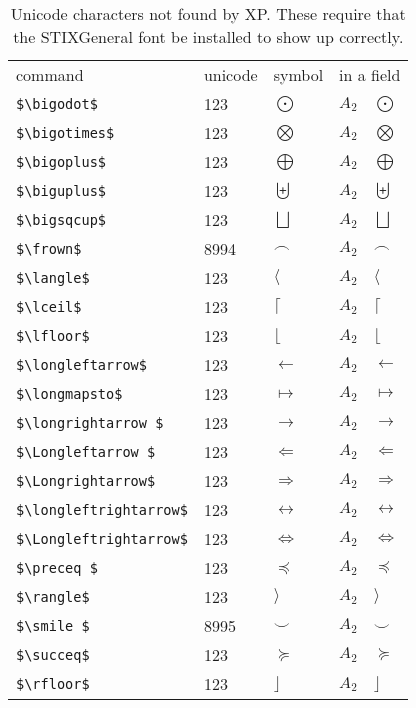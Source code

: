 \documentclass{article}
\begin{document}
\begin{table}
\begin{center}
\begin{tabular}{llll}
 command                   & unicode & symbol          & in a field\\
\verb#$\bigodot$#             & 123 & $\bigodot$        & $A_2 \quad \bigodot$\\
\verb#$\bigotimes$#           & 123 & $\bigotimes$      & $A_2 \quad \bigotimes$\\
\verb#$\bigoplus$#            & 123 & $\bigoplus$       & $A_2 \quad \bigoplus$\\
\verb#$\biguplus$#            & 123 & $\biguplus$       & $A_2 \quad \biguplus$\\
\verb#$\bigsqcup$#            & 123 & $\bigsqcup$       & $A_2 \quad \bigsqcup$\\
\verb#$\frown$#               & 8994 & $\frown$          & $A_2 \quad \frown$\\
\verb#$\langle$#              & 123 & $\langle$         & $A_2 \quad \langle$\\
\verb#$\lceil$#               & 123 & $\lceil$          & $A_2 \quad \lceil$\\
\verb#$\lfloor$#              & 123 & $\lfloor$         & $A_2 \quad \lfloor$\\
\verb#$\longleftarrow$#       & 123 & $\longleftarrow $ & $A_2 \quad \longleftarrow $\\
\verb#$\longmapsto$#          & 123 & $\longmapsto$     & $A_2 \quad \longmapsto$\\
\verb#$\longrightarrow $#     & 123 & $\longrightarrow$ & $A_2 \quad \longrightarrow $\\
\verb#$\Longleftarrow $#      & 123 & $\Longleftarrow $ & $A_2 \quad \Longleftarrow $\\
\verb#$\Longrightarrow$#      & 123 & $\Longrightarrow$ & $A_2 \quad \Longrightarrow$\\
\verb#$\longleftrightarrow$#  & 123 & $\longleftrightarrow$ & $A_2 \quad \longleftrightarrow $\\
\verb#$\Longleftrightarrow$#  & 123 & $\Longleftrightarrow$ & $A_2 \quad \Longleftrightarrow$\\
\verb#$\preceq $#             & 123 & $\preceq $        & $A_2 \quad \preceq $\\
\verb#$\rangle$#              & 123 & $\rangle$         & $A_2 \quad \rangle$\\
\verb#$\smile $#              & 8995 & $\smile $         & $A_2 \quad \smile $\\
\verb#$\succeq$#              & 123 & $\succeq$         & $A_2 \quad \succeq$\\
\verb#$\rfloor$#              & 123 & $\rfloor$         & $A_2 \quad \rfloor$\\
\end{tabular}
\end{center}
\caption{Unicode characters not found by XP.  These require that the STIXGeneral
font be installed to show up correctly.}
\end{table}
\end{document}
